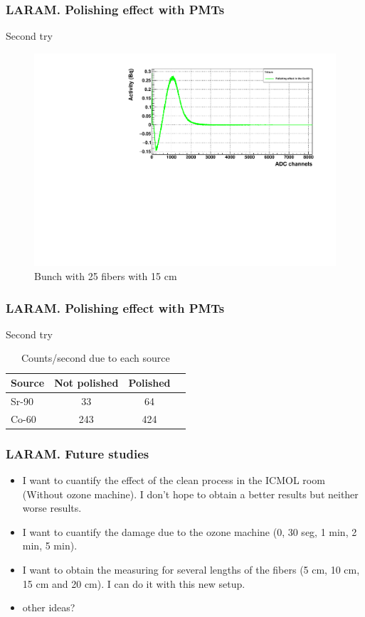 \documentclass{beamer}
\begin{document}
\begin{frame}
\frametitle{LARAM. Polishing effect with PMTs}
Second try

\begin{figure}[hbtp]
\centering
\includegraphics[scale=0.5]{LARAM/Polishing_effect/Second_try/Co_60_clear.pdf}
\caption{Bunch with 25 fibers with 15 cm}
\end{figure}

\end{frame}

\begin{frame}
\frametitle{LARAM. Polishing effect with PMTs}
Second try

\begin{table}
\begin{tabular}{l | c | c | c}
Source & Not polished & Polished \\
\hline \hline
Sr-90 & 33 & 64  \\ 
Co-60 & 243 & 424
\end{tabular}
\caption{Counts/second due to each source}
\end{table}

\end{frame}

\begin{frame}
\frametitle{LARAM. Future studies}

\begin{itemize}
\item{} I want to cuantify the effect of the clean process in the ICMOL room (Without ozone machine). I don't hope to obtain a better results but neither worse results.
\item{} I want to cuantify the damage due to the ozone machine (0, 30 seg, 1 min, 2 min, 5 min).
\item{} I want to obtain the measuring for several lengths of the fibers (5 cm, 10 cm, 15 cm and 20 cm). I can do it with this new setup.
\item{} other ideas?

\end{itemize}

\end{frame}
\end{document}
